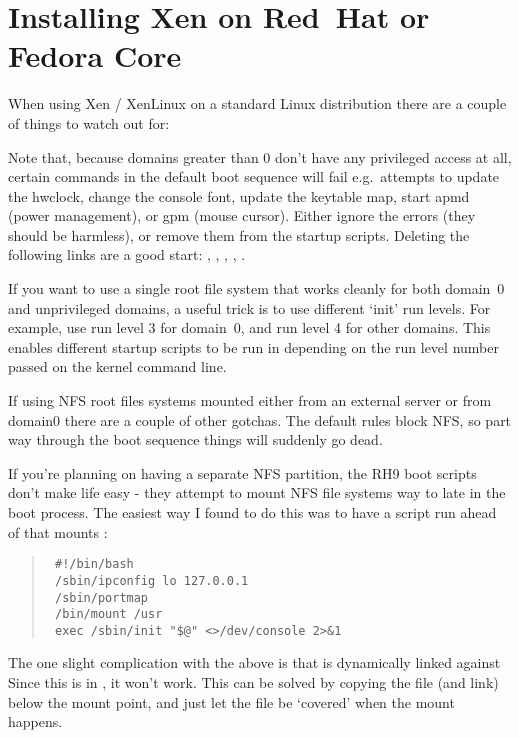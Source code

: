 \chapter{Installing Xen on Red~Hat or Fedora Core}

When using Xen / XenLinux on a standard Linux distribution there are a
couple of things to watch out for:

Note that, because domains greater than 0 don't have any privileged
access at all, certain commands in the default boot sequence will fail
e.g.\ attempts to update the hwclock, change the console font, update
the keytable map, start apmd (power management), or gpm (mouse
cursor).  Either ignore the errors (they should be harmless), or
remove them from the startup scripts.  Deleting the following links
are a good start: {}, {},
{}, {}, {}.

If you want to use a single root file system that works cleanly for
both domain~0 and unprivileged domains, a useful trick is to use
different `init' run levels. For example, use run level 3 for
domain~0, and run level 4 for other domains. This enables different
startup scripts to be run in depending on the run level number passed
on the kernel command line.

If using NFS root files systems mounted either from an external server
or from domain0 there are a couple of other gotchas.  The default
{} rules block NFS, so part way through
the boot sequence things will suddenly go dead.

If you're planning on having a separate NFS {} partition,
the RH9 boot scripts don't make life easy - they attempt to mount NFS
file systems way to late in the boot process. The easiest way I found
to do this was to have a {} script run ahead of
{} that mounts {}:

\begin{quote}
  \begin{small}\begin{verbatim}
 #!/bin/bash
 /sbin/ipconfig lo 127.0.0.1
 /sbin/portmap
 /bin/mount /usr
 exec /sbin/init "$@" <>/dev/console 2>&1
\end{verbatim}\end{small}
\end{quote}


The one slight complication with the above is that
{} is dynamically linked against
{} Since this is in {}, it
won't work. This can be solved by copying the file (and link) below
the {} mount point, and just let the file be `covered' when
the mount happens.

